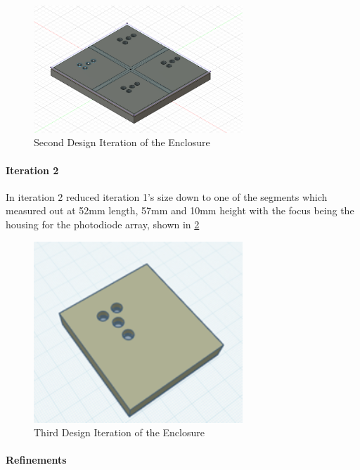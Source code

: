 \begin{figure}[htbp]
    \centering
    \includegraphics[width=0.7\textwidth]{figures/CAD-3DPrint/2ndIteration.png}
    \caption{Second Design Iteration of the Enclosure}
    \label{fig:CAD2}
\end{figure}

\paragraph{Iteration 2}

In iteration 2 reduced iteration 1's size down to one of the segments which measured out at 52mm length, 57mm and 10mm height with the focus being the housing for the photodiode array, shown in \ref{fig:CAD3}

\begin{figure}[htbp]
    \centering
    \includegraphics[width=0.7\textwidth]{figures/CAD-3DPrint/3rdIteration.png}
    \caption{Third Design Iteration of the Enclosure}
    \label{fig:CAD3}
\end{figure}

\paragraph{Refinements}

